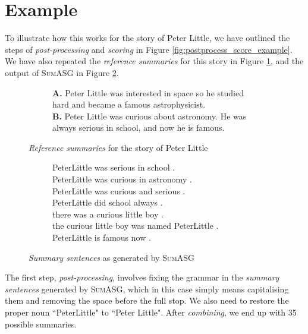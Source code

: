 \section{Example}
\label{sec:postprocess_example}

To illustrate how this works for the story of Peter Little, we have outlined the steps of \textit{post-processing} and \textit{scoring} in Figure \ref{fig:postprocess_score_example}. We have also repeated the \textit{reference summaries} for this story in Figure \ref{fig:peter_little_reference_summaries}, and the output of \textsc{SumASG} in Figure \ref{fig:peter_little_summary_sentences}.

\begin{figure}[H]
\begin{subfigure}{\textwidth}
\begin{displayquote}
\textbf{A.} Peter Little was interested in space so he studied hard and became a famous astrophysicist.\\
\textbf{B.} Peter Little was curious about astronomy. He was always serious in school, and now he is famous.
\end{displayquote}
\end{subfigure}
\caption{\textit{Reference summaries} for the story of Peter Little}
\label{fig:peter_little_reference_summaries}
\end{figure}

\begin{figure}[H]
\begin{subfigure}{\textwidth}
\begin{displayquote}
PeterLittle was serious in school .\\
PeterLittle was curious in astronomy .\\
PeterLittle was curious and serious .\\
PeterLittle did school always .\\
there was a curious little boy .\\
the curious little boy was named PeterLittle .\\
PeterLittle is famous now .
\end{displayquote}
\end{subfigure}
\caption{\textit{Summary sentences} as generated by \textsc{SumASG}}
\label{fig:peter_little_summary_sentences}
\end{figure}

\noindent
The first step, \textit{post-processing}, involves fixing the grammar in the \textit{summary sentences} generated by \textsc{SumASG}, which in this case simply means capitalising them and removing the space before the full stop. We also need to restore the proper noun ``PeterLittle" to ``Peter Little". After \textit{combining}, we end up with 35 possible summaries.

